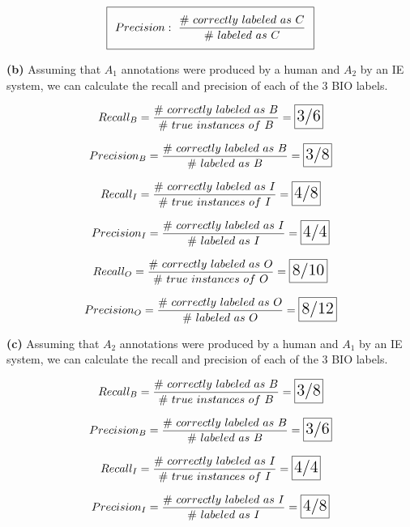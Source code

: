 \documentclass[11pt]{article}
\renewcommand\part[1]{\vspace{.10in}\textbf{(#1)}}
\begin{document}
\begin{equation}
\setlength\fboxsep{0.25cm}
\setlength\fboxrule{0.4pt}
\boxed{Precision: \ \frac{\# \ correctly \ labeled \ as \ C}{\# \ labeled \ as \ C}}
\end{equation}

\part{b} Assuming that $A_1$ annotations were produced by a human and $A_2$ by an IE system, we can calculate the recall and precision of each of the 3 BIO labels.

$$Recall_B = \frac{\# \ correctly \ labeled \ as \ B}{\# \ true \ instances \ of \ B} = \framebox[1.2\width]{\Large{3/6}}$$

$$Precision_B = \frac{\# \ correctly \ labeled \ as \ B}{\# \ labeled \ as \ B} = \framebox[1.2\width]{\Large{3/8}}$$

$$Recall_I = \frac{\# \ correctly \ labeled \ as \ I}{\# \ true \ instances \ of \ I} = \framebox[1.2\width]{\Large{4/8}}$$

$$Precision_I = \frac{\# \ correctly \ labeled \ as \ I}{\# \ labeled \ as \ I} = \framebox[1.2\width]{\Large{4/4}}$$

$$Recall_O = \frac{\# \ correctly \ labeled \ as \ O}{\# \ true \ instances \ of \ O} = \framebox[1.2\width]{\Large{8/10}}$$

$$Precision_O = \frac{\# \ correctly \ labeled \ as \ O}{\# \ labeled \ as \ O} = \framebox[1.2\width]{\Large{8/12}}$$

\part{c} Assuming that $A_2$ annotations were produced by a human and $A_1$ by an IE system, we can calculate the recall and precision of each of the 3 BIO labels.

$$Recall_B = \frac{\# \ correctly \ labeled \ as \ B}{\# \ true \ instances \ of \ B} = \framebox[1.2\width]{\Large{3/8}}$$

$$Precision_B = \frac{\# \ correctly \ labeled \ as \ B}{\# \ labeled \ as \ B} = \framebox[1.2\width]{\Large{3/6}}$$

$$Recall_I = \frac{\# \ correctly \ labeled \ as \ I}{\# \ true \ instances \ of \ I} = \framebox[1.2\width]{\Large{4/4}}$$

$$Precision_I = \frac{\# \ correctly \ labeled \ as \ I}{\# \ labeled \ as \ I} = \framebox[1.2\width]{\Large{4/8}}$$
\end{document}
